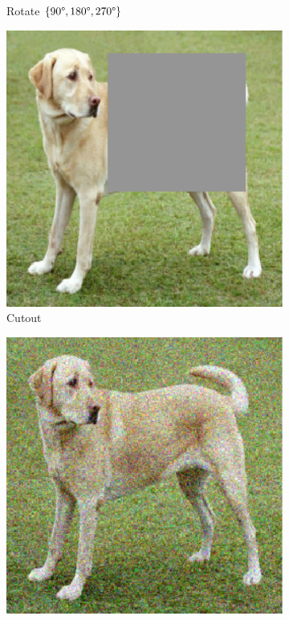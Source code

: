 \begin{figure}[th]
\begin{subfigure}{.19\textwidth}
  \caption{Rotate {\tiny$\{90\degree,180\degree,270\degree\}$}}
\end{subfigure}\begin{subfigure}{.19\textwidth}
  \centering
  \includegraphics[width=0.9\linewidth]{chapters/assets/ssl_figs/transforms/img_cutout.pdf}
  \caption{Cutout}
\end{subfigure}\begin{subfigure}{.19\textwidth}
  \centering
  \includegraphics[width=0.9\linewidth]{chapters/assets/ssl_figs/transforms/img_noise.pdf}

\end{subfigure}
\end{figure}
